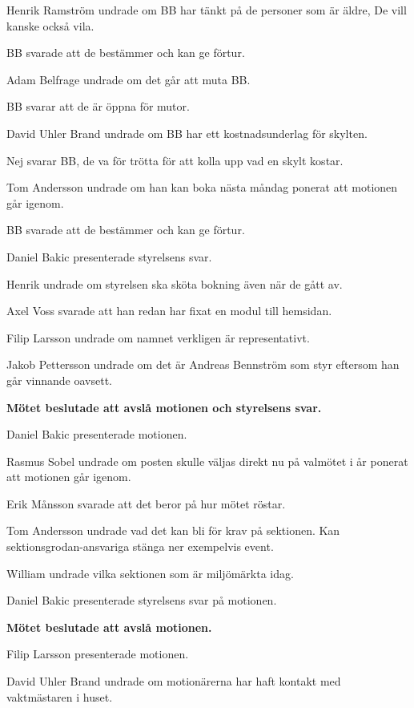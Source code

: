 \documentclass[10pt]{article}
\begin{document}
\begin{paragrafer}
\begin{paragrafer}
		Henrik Ramström undrade om BB har tänkt på de personer som är äldre, De vill kanske också vila.

		BB svarade att de bestämmer och kan ge förtur.

		Adam Belfrage undrade om det går att muta BB. 

		BB svarar att de är öppna för mutor. 

		David Uhler Brand undrade om BB har ett kostnadsunderlag för skylten.

		Nej svarar BB, de va för trötta för att kolla upp vad en skylt kostar. 

		Tom Andersson undrade om han kan boka nästa måndag ponerat att motionen går igenom.
		
		BB svarade att de bestämmer och kan ge förtur.
		
		Daniel Bakic presenterade styrelsens svar.

		Henrik undrade om styrelsen ska sköta bokning även när de gått av. 

		Axel Voss svarade att han redan har fixat en modul till hemsidan.

		Filip Larsson undrade om namnet verkligen är representativt.

		Jakob Pettersson undrade om det är Andreas Bennström som styr eftersom han går vinnande oavsett.

		\textbf{Mötet beslutade att avslå motionen och styrelsens svar.}


		Daniel Bakic presenterade motionen. 

		Rasmus Sobel undrade om posten skulle väljas direkt nu på valmötet i år ponerat att motionen går igenom.

		Erik Månsson svarade att det beror på hur mötet röstar.

		Tom Andersson undrade vad det kan bli för krav på sektionen. Kan sektionsgrodan-ansvariga stänga ner exempelvis event. 

		William undrade vilka sektionen som är miljömärkta idag.

		Daniel Bakic presenterade styrelsens svar på motionen. 

		\textbf{Mötet beslutade att avslå motionen.}

		\newpage
		

		Filip Larsson presenterade motionen. 

		David Uhler Brand undrade om motionärerna har haft kontakt med vaktmästaren i huset.


\end{paragrafer}
\end{paragrafer}
\end{document}
